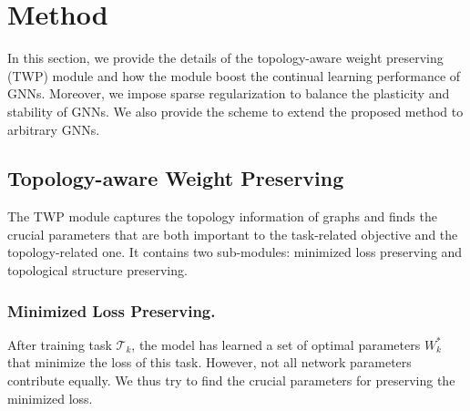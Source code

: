 \documentclass[letterpaper]{article} %
\begin{document}
\section{Method}
In this section, 
we provide the details of
the topology-aware weight preserving (TWP) module
and how the module boost
the continual learning performance of
GNNs.
Moreover, we impose sparse regularization to
balance the plasticity and stability of GNNs.
We also provide the scheme to extend the proposed 
method to arbitrary GNNs.

\subsection{Topology-aware Weight Preserving}

The TWP module captures the topology information of graphs 
and finds the crucial parameters that are both important 
to the task-related objective and the topology-related one. 
It contains two sub-modules: 
minimized loss preserving and topological structure preserving.

\subsubsection{Minimized Loss Preserving.} 
After training task $\mathcal{T}_k$, the model has learned 
a set of optimal parameters $W_k^*$ 
that minimize the loss of this task.
However, not all network parameters contribute equally.
We thus try to find the crucial parameters for 
preserving the minimized loss.
\end{document}
